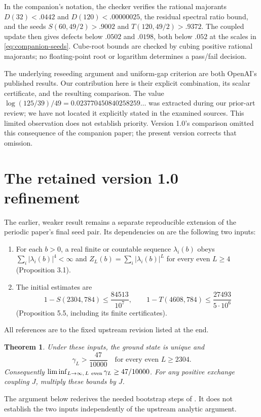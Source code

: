 \documentclass[11pt,a4paper]{article}
\newtheorem{theorem}{Theorem}
\newcommand{\gap}{\gamma}
\begin{document}
In the companion's notation, the checker verifies the rational
majorants $D(32)<.0442$ and $D(120)<.00000025$, the residual spectral
ratio bound, and the seeds
$S(60,49/2)>.9002$ and $T(120,49/2)>.9372$.
The coupled update then gives defects below $.0502$ and $.0198$,
both below $.052$ at the scales in \eqref{eq:companion-seeds}.
Cube-root bounds are checked by cubing positive rational majorants;
no floating-point root or logarithm determines a pass/fail decision.

The underlying reseeding argument and uniform-gap criterion are both
OpenAI's published results. Our contribution here is their explicit
combination, its scalar certificate, and the resulting comparison.
The value $\log(125/39)/49=0.023770450840258259\ldots$ was extracted
during our prior-art review; we have not located it explicitly stated
in the examined sources. This limited observation does not establish
priority. Version 1.0's comparison omitted this consequence of the
companion paper; the present version corrects that omission.

\section{The retained version 1.0 refinement}
The earlier, weaker result remains a separate reproducible extension
of the periodic paper's final seed pair. Its dependencies on
\cite{upstream} are the following two inputs:
\begin{enumerate}
\item For each $b>0$, a real finite or countable sequence $\lambda_i(b)$
obeys $\sum_i|\lambda_i(b)|^4<\infty$ and
$Z_L(b)=\sum_i|\lambda_i(b)|^L$ for every even $L\ge4$
(Proposition 3.1).
\item The initial estimates are
\begin{equation}\label{eq:seeds}
 1-S(2304,784)\le\frac{84513}{10^7},\qquad
 1-T(4608,784)\le\frac{27493}{5\cdot10^6}
\end{equation}
(Proposition 5.5, including its finite certificates).
\end{enumerate}
All references are to the fixed upstream revision listed at the end.

\begin{theorem}\label{thm:legacy}
Under these inputs, the ground state is unique and
\[
 \boxed{\gap_L>\frac{47}{10000}\quad
        \text{for every even }L\ge2304.}
\]
Consequently $\liminf_{L\to\infty,\,L\ {\rm even}}\gap_L\ge47/10000$.
For any positive exchange coupling $J$, multiply these bounds by $J$.
\end{theorem}
The argument below rederives the needed bootstrap steps of
\cite[Lemma 4.2 and Proposition 4.3]{upstream}. It does not establish
the two inputs independently of the upstream analytic argument.
\end{document}
